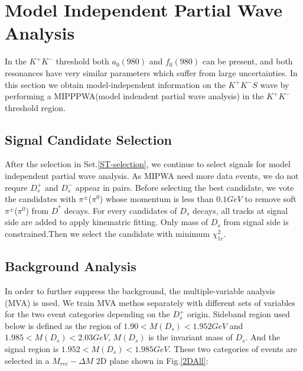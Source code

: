 \section{Model Independent Partial Wave Analysis}
\par{In the $K^{+}K^{-}$ threshold both $a_{0}(980)$ and $f_{0}(980)$ can be present, and both resonances have very similar parameters which suffer from large uncertainties. In this section we obtain model-independent information on the $K^{+}K^{-} S$ wave by performing a MIPPPWA(model indendent partial wave analysis) in the  $K^{+}K^{-}$ threshold region.}
\subsection{Signal Candidate Selection}
\label{MIPWASelection}
\par{
    After the selection in Set.\ref{ST-selection}, we continue to select signals for model independent partial wave analysis.
    As MIPWA need more data events, we do not requre $D_{s}^{+}$ and $D_{s}^{-}$ appear in pairs. 
Before selecting the best candidate,  we vote the candidates with $\pi^{\pm}$($\pi^{0}$) whose momentum is less than $0.1GeV$ to remove soft $\pi^{\pm}$($\pi^{0}$) from $D^{*}$ decays.
For every candidates of $D_{s}$ decays, all tracks at signal side are added to apply kinematric fitting. Only mass of $D_{s}$ from signal side is constrained.Then we select the candidate with minimum $\chi_{1c}^{2}$.
}
\subsection{Background Analysis}
In order to further suppress the background, the multiple-variable analysis (MVA) is used. We train MVA methos separately with different sets of variables for the two event categories depending on the $D_{s}^{+}$ origin. 
Sideband region used below is defined as the region of  $1.90 < M(D_{s}) < 1.952 GeV$ and   $1.985 < M(D_{s}) < 2.03 GeV$, $M(D_{s})$ is the invariant mass of $D_{s}$.
And the signal region is $1.952 < M(D_{s}) < 1.985 GeV$.
These two categories of events are selected in a $M_{rec}-\Delta{M}$ 2D plane shown in Fig.\ref{2DAll}:




